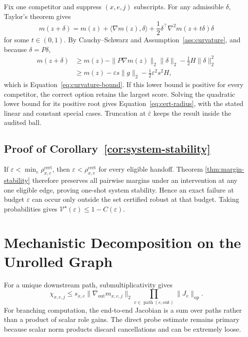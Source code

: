 \documentclass[11pt]{article}
\newcommand{\eps}{\varepsilon}
\newcommand{\Vuln}{\mathcal V}
\begin{document}
Fix one competitor and suppress \((x,e,j)\) subscripts. For any admissible
$\delta$, Taylor's theorem gives
\begin{equation}
    m(z+\delta)
    =m(z)+\langle \nabla m(z),\delta\rangle
    +\frac{1}{2}\delta^\top
    \nabla^2m(z+t\delta)\delta
\end{equation}
for some $t\in(0,1)$. By Cauchy--Schwarz and
Assumption~\ref{ass:curvature}, and because \(\delta=P\delta\),
\begin{align}
    m(z+\delta)
    &\ge m(z)-\|P\nabla m(z)\|_2\|\delta\|_2
    -\frac{1}{2}H\|\delta\|_2^2\\
    &\ge m(z)-\eps s\|g\|_2
    -\frac{1}{2}\eps^2s^2H,
\end{align}
which is Equation~\eqref{eq:curvature-bound}. If this lower bound is positive
for every competitor, the correct option retains the largest score. Solving the
quadratic lower bound for its positive root gives
Equation~\eqref{eq:cert-radius}, with the stated linear and constant special
cases. Truncation at \(\bar\eps\) keeps the result inside the audited ball.

\subsection{Proof of Corollary~\ref{cor:system-stability}}

If \(\eps<\min_e\rho^{\mathrm{cert}}_{x,e}\), then
\(\eps<\rho^{\mathrm{cert}}_{x,e}\) for every eligible handoff. Theorem
\ref{thm:margin-stability} therefore preserves all pairwise margins under an
intervention at any one eligible edge, proving one-shot system stability. Hence
an exact failure at budget \(\eps\) can occur only outside the set certified
robust at that budget. Taking probabilities gives
\(\Vuln^\star(\eps)\le1-C(\eps)\).

\section{Mechanistic Decomposition on the Unrolled Graph}

For a unique downstream path, submultiplicativity gives
\begin{equation}
    \chi_{x,e,j}
    \le
    s_{x,e}
    \|\nabla_{\mathrm{out}}m_{x,e,j}\|_2
    \prod_{v\in\operatorname{path}(e,\mathrm{out})}
    \|J_v\|_{\mathrm{op}}.
\end{equation}
For branching computation, the end-to-end Jacobian is a sum over paths rather
than a product of scalar role gains. The direct probe estimate remains primary
because scalar norm products discard cancellations and can be extremely loose.
\end{document}
